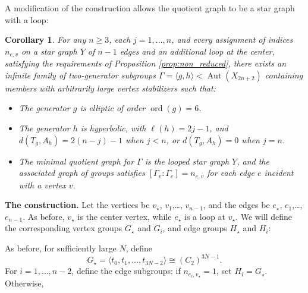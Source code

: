 \documentclass[12pt,leqno]{amsart}
\newcommand{\2}{L^2_{\rm per}(0, T)}
\newtheorem{cor}{Corollary}[section]
\newcommand{\aut}{{\operatorname{Aut}}}
\newcommand{\ord}{{\operatorname{ord}}}
\numberwithin{equation}{section}
\numberwithin{figure}{section}
\begin{document}
A modification of the construction allows the quotient graph to be a star graph with a loop:
\begin{cor}\label{thm:star_loop}
    For any $n\geq 3$, each $j  = 1, \dots, n$, and every assignment of indices $n_{e,v}$ on a star graph $Y$ of $n-1$ edges and an additional loop at the center, satisfying the requirements of Proposition \ref{prop:non_reduced}, there exists an infinite family of two-generator subgroups $\Gamma = \langle g,h\rangle< \aut(X_{2n+2})$ containing members with arbitrarily large vertex stabilizers such that:
    \begin{itemize}
        \item The generator $g$ is elliptic of order $\ord(g)= 6$.
        \item The generator $h$ is hyperbolic, with $\ell(h) = 2j-1$, and $d(T_g,A_h) = 2(n-j)-1$ when $j<n$, or $d(T_g,A_h) = 0$ when $j=n$.
        \item The minimal quotient graph for $\Gamma$ is the looped star graph $Y$, and the associated graph of groups satisfies $[\Gamma_v : \Gamma_e] = n_{e,v}$ for each edge $e$ incident with a vertex $v$.
    \end{itemize}
\end{cor}
\textbf{The construction.} Let the vertices be $v_\star$, $v_1$,\dots, $v_{n-1}$, and the edges be $e_\star$, $e_1$,\dots, $e_{n-1}$. As before, $v_\star$ is the center vertex, while $e_\star$ is a loop at $v_{\star}$. We will define the corresponding vertex groups $G_\star$ and $G_i$, and edge groups $H_\star$ and $H_i$:
\begin{center}
\end{center}
As before, for sufficiently large $N$, define 
\[
G_\star = \langle t_0,t_1,\dots, t_{3N-2}\rangle\cong (C_2)^{3N-1}.
\]
For $i=1,\dots, n-2$, define the edge subgroups: if $n_{e_i,v_\star} = 1$, set $H_i = G_\star$. Otherwise,
\end{document}
